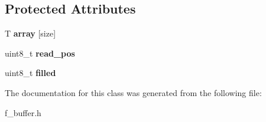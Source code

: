 \subsection*{Protected Attributes}
\begin{DoxyCompactItemize}
\item 
\mbox{\label{classfsl_1_1con_1_1array__buffer_a6d8325c261d8288a36b6b3b39c026940}} 
T {\bfseries array} \mbox{[}size\mbox{]}
\item 
\mbox{\label{classfsl_1_1con_1_1array__buffer_a3a7984ff937bea461b8a71d6edd43ef1}} 
uint8\+\_\+t {\bfseries read\+\_\+pos}
\item 
\mbox{\label{classfsl_1_1con_1_1array__buffer_a0e362d2a64b2dbe8c8bb140fa943cac4}} 
uint8\+\_\+t {\bfseries filled}
\end{DoxyCompactItemize}


The documentation for this class was generated from the following file\+:\begin{DoxyCompactItemize}
\item 
f\+\_\+buffer.\+h\end{DoxyCompactItemize}
